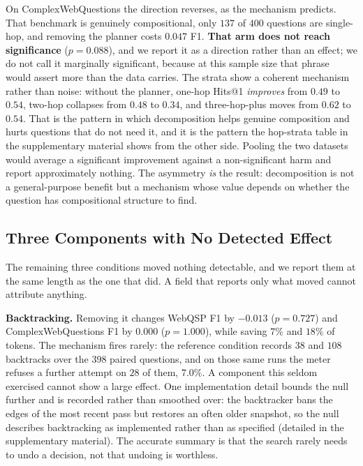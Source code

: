 On ComplexWebQuestions the direction reverses, as the mechanism
predicts. That benchmark is genuinely compositional, only $137$ of $400$
questions are single-hop, and removing the planner costs $0.047$ F1.
\textbf{That arm does not reach significance} ($p = 0.088$), and we
report it as a direction rather than an effect; we do not call it
marginally significant, because at this sample size that phrase would
assert more than the data carries. The strata show a coherent mechanism
rather than noise: without the planner, one-hop Hits@1 \emph{improves}
from $0.49$ to $0.54$, two-hop collapses from $0.48$ to $0.34$, and
three-hop-plus moves from $0.62$ to $0.54$. That is the pattern in which
decomposition helps genuine composition and hurts questions that do not
need it, and it is the pattern the hop-strata table in the supplementary
material shows from the other side. Pooling the two datasets would
average a significant improvement against a non-significant harm and
report approximately nothing. The asymmetry \emph{is} the result:
decomposition is not a general-purpose benefit but a mechanism whose
value depends on whether the question has compositional structure to
find.

\subsection{Three Components with No Detected Effect}\label{sec:nulls}

The remaining three conditions moved nothing detectable, and we report
them at the same length as the one that did. A field that reports only
what moved cannot attribute anything.

\textbf{Backtracking.} Removing it changes WebQSP F1 by $-0.013$ ($p =
0.727$) and ComplexWebQuestions F1 by $0.000$ ($p = 1.000$), while
saving $7\%$ and $18\%$ of tokens. The mechanism fires rarely: the
reference condition records $38$ and $108$ backtracks over the $398$
paired questions, and on those same runs the meter refuses a further
attempt on $28$ of them, $7.0\%$. A component this seldom exercised
cannot show a large effect. One implementation detail bounds the null
further and is recorded rather than smoothed over: the backtracker bans
the edges of the most recent pass but restores an often older snapshot,
so the null describes backtracking as implemented rather than as
specified (detailed in the supplementary material). The accurate summary
is that the search rarely needs to undo a decision, not that undoing is
worthless.

